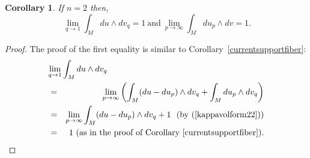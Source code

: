 \documentclass{ip-journal}
\newtheorem{corollary}[theorem]{Corollary}
\theoremstyle{definition}
\numberwithin{equation}{section}
\begin{document}
\begin{corollary}\label{withoutcont}  If $n = 2$ then,
\[
 \ \lim_{q\rightarrow 1} \int_M du \wedge dv_q = 1 \ \mbox{and} \ \lim_{p \rightarrow \infty} \int_M du_p \wedge dv =1.
\]
\end{corollary}
\begin{proof}  
The proof of the first equality is similar to Corollary~\ref{currentsupportfiber}:
\begin{eqnarray*}
\lefteqn{\lim_{q\rightarrow 1} \int_M du \wedge dv_q}\\
&=&\lim_{p\rightarrow \infty} \left( \int_M (du-du_p) \wedge dv_q+ \int_M du_p \wedge dv_q \right)\\
&=&\lim_{p\rightarrow \infty} \int_M (du-du_p) \wedge dv_q  +1 \ \ \mbox{(by (\ref{kappavolform22}))} \\
&=& 1 \ (\mbox{as in the proof of Corollary~\ref{currentsupportfiber}}).
\end{eqnarray*}



\end{proof}
\end{document}
